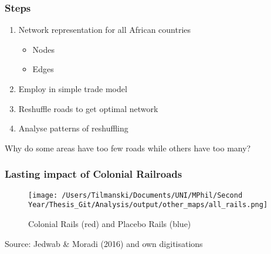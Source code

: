 \documentclass[]{beamer}   	%
\begin{document}
\begin{frame}
  \frametitle{Steps}
  \begin{enumerate}
    \item Network representation for all African countries
    \begin{itemize}
      \item Nodes
      \item Edges
    \end{itemize}
    \item Employ in simple trade model
    \item Reshuffle roads to get optimal network
    \item \alert{Analyse patterns of reshuffling}
  \end{enumerate}
\end{frame}

\begin{frame}
Why do some areas have too few roads while others have too many?
\end{frame}

\begin{frame}
\frametitle{Lasting impact of Colonial Railroads}
\begin{figure}
\centering
\texttt{[image: /Users/Tilmanski/Documents/UNI/MPhil/Second Year/Thesis\_Git/Analysis/output/other\_maps/all\_rails.png]}
\caption{Colonial Rails (red) and Placebo Rails (blue)}
\label{fig:Rail Maps}
\end{figure}
  \tiny Source: Jedwab \& Moradi (2016) and own digitisations
\end{frame}
\end{document}
